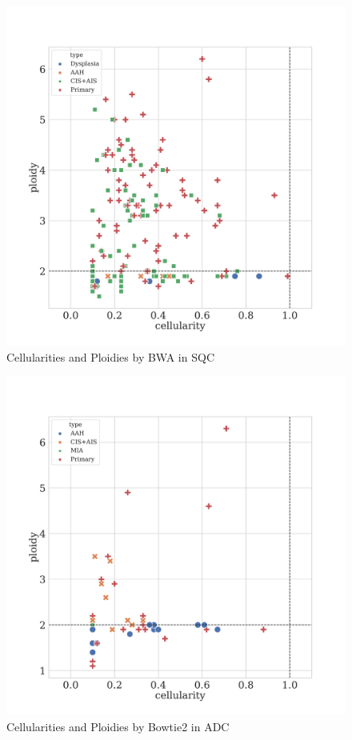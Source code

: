 \documentclass[a4paper]{article}
\begin{document}
                \begin{figure}[htbp]
                    \centering
                    \includegraphics[width=0.6 \linewidth]{figures/Sequenza/BWA-sequenza-SQC.pdf}
                    \caption{Cellularities and Ploidies by BWA in SQC}
                    \label{fig:sequenza-BWA-SQC}
                \end{figure}

                \begin{figure}[htbp]
                    \centering
                    \includegraphics[width=0.6 \linewidth]{figures/Sequenza/Bowtie2-sequenza-ADC.pdf}
                    \caption{Cellularities and Ploidies by Bowtie2 in ADC}
                    \label{fig:sequenza-Bowtie2-ADC}
                \end{figure}
\end{document}
